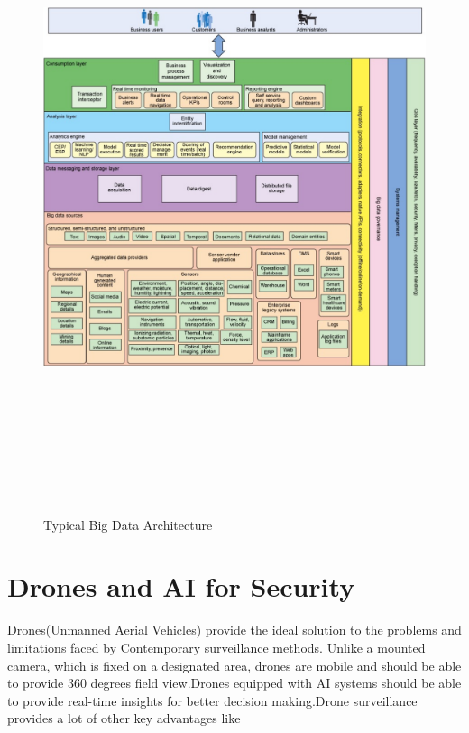 \documentclass[sigconf]{acmart}
\begin{document}
\begin{figure}
\includegraphics[height=7.5in, width=7.5in]{images/BigDataArchitecture.pdf}
\caption{Typical Big Data Architecture}
\end{figure}
 
\section{Drones and AI for Security}
Drones(Unmanned Aerial Vehicles) provide the ideal solution to the problems and limitations faced by Contemporary surveillance methods. Unlike a mounted camera, which is fixed on a designated area, drones are mobile and should be able to provide 360 degrees field view.Drones equipped with AI systems should be able to provide real-time insights for better decision making.Drone surveillance provides a lot of other key advantages like
\end{document}
